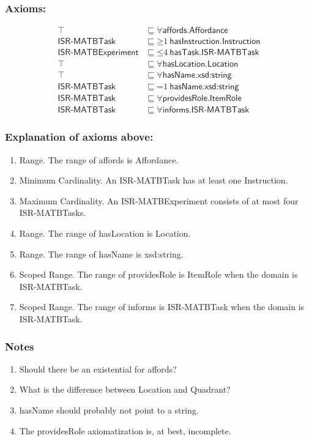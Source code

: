 \subsubsection*{Axioms:}

\begin{align}
\top &\sqsubseteq \forall\textsf{affords.Affordance} \\
\textsf{ISR-MATBTask} &\sqsubseteq \mathord{\geq}1~\textsf{hasInstruction.Instruction} \\
\textsf{ISR-MATBExperiment} &\sqsubseteq \mathord{\leq}4~\textsf{hasTask.ISR-MATBTask} \\
\top &\sqsubseteq \forall \textsf{hasLocation.Location} \\
\top &\sqsubseteq \forall \textsf{hasName.xsd:string} \\
\textsf{ISR-MATBTask} &\sqsubseteq \mathord{=}1~\textsf{hasName.xsd:string} \\
\textsf{ISR-MATBTask} &\sqsubseteq \forall\textsf{providesRole.ItemRole} \\
\textsf{ISR-MATBTask} &\sqsubseteq \forall\textsf{informs.ISR-MATBTask}
\end{align}

\subsubsection*{Explanation of axioms above:}

\begin{enumerate}
\item Range. The range of \textsf{affords} is \textsf{Affordance}.
\item Minimum Cardinality. An \textsf{ISR-MATBTask} has at least one \textsf{Instruction}.
\item Maximum Cardinality. An \textsf{ISR-MATBExperiment} consists of at most four \textsf{ISR-MATBTasks}.
\item Range. The range of \textsf{hasLocation} is \textsf{Location}.
\item Range. The range of \textsf{hasName} is \textsf{xsd:string}.
\item Scoped Range. The range of \textsf{providesRole} is \textsf{ItemRole} when the domain is \textsf{ISR-MATBTask}.
\item Scoped Range. The range of \textsf{informs} is \textsf{ISR-MATBTask} when the domain is \textsf{ISR-MATBTask}.

\end{enumerate}

\subsubsection*{Notes}
\begin{enumerate}
\item Should there be an existential for \textsf{affords}?
\item What is the difference between Location and Quadrant?
\item \textsf{hasName} should probably not point to a string.
\item The \textsf{providesRole} axiomatization is, at best, incomplete.
\end{enumerate}


